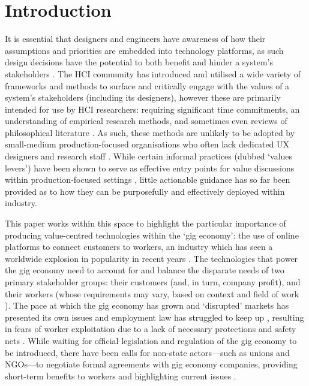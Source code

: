 \section{Introduction}
It is essential that designers and engineers have awareness of how their assumptions and priorities are embedded into technology platforms, as such design decisions have the potential to both benefit and hinder a system's stakeholders \cite{winner1980}. The HCI community has introduced and utilised a wide variety of frameworks and methods to surface and critically engage with the values of a system's stakeholders (including its designers), however these are primarily intended for use by HCI researchers: requiring significant time commitments, an understanding of empirical research methods, and sometimes even reviews of philosophical literature \cite{friedman2006, flanagan2014, Alshehri2020, shilton2018}. As such, these methods are unlikely to be adopted by small-medium production-focused organisations who often lack dedicated UX designers and research staff \cite{Shilton2013, Ardito2014}. While certain informal practices (dubbed `values levers') have been shown to serve as effective entry points for value discussions within production-focused settings \cite{Shilton2013, shilton2018, shilton2019}, little actionable guidance has so far been provided as to how they can be purposefully and effectively deployed within industry.

This paper works within this space to highlight the particular importance of producing value-centred technologies within the `gig economy': the use of online platforms to connect customers to workers, an industry which has seen a worldwide explosion in popularity in recent years \cite{Taylor2017, islam2019, Wood2019}. The technologies that power the gig economy need to account for and balance the disparate needs of two primary stakeholder groups: their customers (and, in turn, company profit), and their workers (whose requirements may vary, based on context and field of work \cite{carlos2021}). The pace at which the gig economy has grown and `disrupted' markets has presented its own issues and employment law has struggled to keep up \cite{Minter2017}, resulting in fears of worker exploitation due to a lack of necessary protections and safety nets \cite{Balaram2017}. While waiting for official legislation and regulation of the gig economy to be introduced, there have been calls for non-state actors---such as unions and NGOs---to negotiate formal agreements with gig economy companies, providing short-term benefits to workers and highlighting current issues \cite{Minter2017}. 

